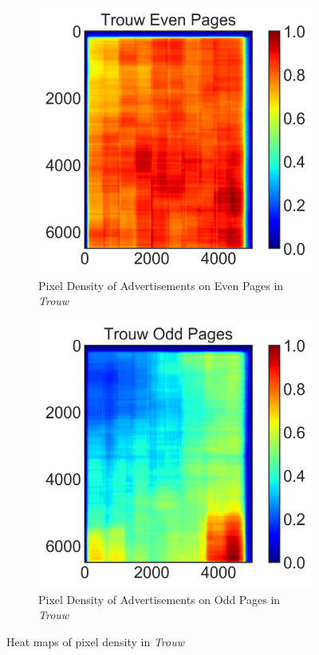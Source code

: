 \documentclass[USenglish]{article}
\begin{document}
\begin{figure}
  \centering
  \begin{subfigure}[b]{0.4\textwidth}
    \includegraphics[width=\textwidth]{figures/Trouw_Even_Pages_heatmap}
    \caption{Pixel Density of Advertisements on Even Pages in \textit{Trouw}}
    \label{fig:heatmapa}
  \end{subfigure}
  \begin{subfigure}[b]{0.4\textwidth}
    \includegraphics[width=\textwidth]{figures/Trouw_Odd_Pages_heatmap}
    \caption{Pixel Density of Advertisements on Odd Pages in \textit{Trouw}}
    \label{fig:heatmapb}
  \end{subfigure}
  \caption{Heat maps of pixel density in \textit{Trouw}}
\end{figure}
\end{document}
